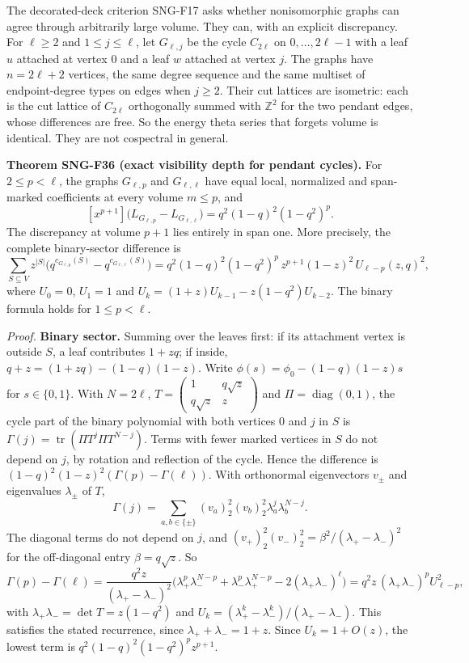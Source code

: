 \documentclass[
  11pt,
  a4paper,
]{report}
\begin{document}
The decorated-deck criterion SNG-F17 asks whether nonisomorphic graphs
can agree through arbitrarily large volume. They can, with an explicit
discrepancy. For \(\ell\ge2\) and \(1\le j\le\ell\), let \(G_{\ell,j}\)
be the cycle \(C_{2\ell}\) on \(0,\ldots,2\ell-1\) with a leaf \(u\)
attached at vertex \(0\) and a leaf \(w\) attached at vertex \(j\). The
graphs have \(n=2\ell+2\) vertices, the same degree sequence and the
same multiset of endpoint-degree types on edges when \(j\ge2\). Their
cut lattices are isometric: each is the cut lattice of \(C_{2\ell}\)
orthogonally summed with \(\mathbb Z^2\) for the two pendant edges,
whose differences are free. So the energy theta series that forgets
volume is identical. They are not cospectral in general.

\textbf{Theorem SNG-F36 (exact visibility depth for pendant cycles).}
For \(2\le p<\ell\), the graphs \(G_{\ell,p}\) and \(G_{\ell,\ell}\)
have equal local, normalized and span-marked coefficients at every
volume \(m\le p\), and \[
[x^{p+1}]\bigl(L_{G_{\ell,p}}-L_{G_{\ell,\ell}}\bigr)=q^2(1-q)^2(1-q^2)^p .
\] The discrepancy at volume \(p+1\) lies entirely in span one. More
precisely, the complete binary-sector difference is \[
\sum_{S\subseteq V}z^{|S|}\bigl(q^{c_{G_{\ell,p}}(S)}-q^{c_{G_{\ell,\ell}}(S)}\bigr)
=q^2(1-q)^2(1-q^2)^p\,z^{p+1}(1-z)^2\,U_{\ell-p}(z,q)^2,
\] where \(U_0=0\), \(U_1=1\) and \(U_k=(1+z)U_{k-1}-z(1-q^2)U_{k-2}\).
The binary formula holds for \(1\le p<\ell\).

\emph{Proof.} \textbf{Binary sector.} Summing over the leaves first: if
its attachment vertex is outside \(S\), a leaf contributes \(1+zq\); if
inside, \(q+z=(1+zq)-(1-q)(1-z)\). Write \(\phi(s)=\phi_0-(1-q)(1-z)s\)
for \(s\in\{0,1\}\). With \(N=2\ell\),
\(T=\begin{pmatrix}1&q\sqrt z\\ q\sqrt z&z\end{pmatrix}\) and
\(\Pi=\operatorname{diag}(0,1)\), the cycle part of the binary
polynomial with both vertices \(0\) and \(j\) in \(S\) is
\(\Gamma(j)=\operatorname{tr}(\Pi T^j\Pi T^{N-j})\). Terms with fewer
marked vertices in \(S\) do not depend on \(j\), by rotation and
reflection of the cycle. Hence the difference is
\((1-q)^2(1-z)^2(\Gamma(p)-\Gamma(\ell))\). With orthonormal
eigenvectors \(v_\pm\) and eigenvalues \(\lambda_\pm\) of \(T\), \[
\Gamma(j)=\sum_{a,b\in\{\pm\}}(v_a)_2^2(v_b)_2^2\lambda_a^j\lambda_b^{N-j}.
\] The diagonal terms do not depend on \(j\), and
\((v_+)_2^2(v_-)_2^2=\beta^2/(\lambda_+-\lambda_-)^2\) for the
off-diagonal entry \(\beta=q\sqrt z\). So \[
\Gamma(p)-\Gamma(\ell)=\frac{q^2z}{(\lambda_+-\lambda_-)^2}\bigl(\lambda_+^p\lambda_-^{N-p}+\lambda_-^p\lambda_+^{N-p}-2(\lambda_+\lambda_-)^\ell\bigr)
=q^2z\,(\lambda_+\lambda_-)^pU_{\ell-p}^2,
\] with \(\lambda_+\lambda_-=\det T=z(1-q^2)\) and
\(U_k=(\lambda_+^k-\lambda_-^k)/(\lambda_+-\lambda_-)\). This satisfies
the stated recurrence, since \(\lambda_++\lambda_-=1+z\). Since
\(U_k=1+O(z)\), the lowest term is \(q^2(1-q)^2(1-q^2)^pz^{p+1}\).
\end{document}
